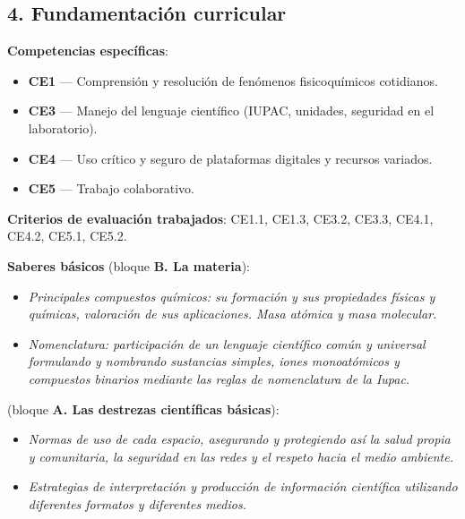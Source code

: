 \documentclass[11pt,a4paper]{article}
\begin{document}
\subsection*{4. Fundamentación curricular}
\textbf{Competencias específicas}:
\begin{itemize}
    \item \textbf{CE1} --- Comprensión y resolución de fenómenos fisicoquímicos cotidianos.
    \item \textbf{CE3} --- Manejo del lenguaje científico (IUPAC, unidades, seguridad en el laboratorio).
    \item \textbf{CE4} --- Uso crítico y seguro de plataformas digitales y recursos variados.
    \item \textbf{CE5} --- Trabajo colaborativo.
\end{itemize}

\textbf{Criterios de evaluación trabajados}: CE1.1, CE1.3, CE3.2, CE3.3, CE4.1, CE4.2, CE5.1, CE5.2.

\textbf{Saberes básicos} (bloque \textbf{B. La materia}):
\begin{itemize}
    \item \textit{Principales compuestos químicos: su formación y sus propiedades físicas y químicas, valoración de sus aplicaciones. Masa atómica y masa molecular.}
    \item \textit{Nomenclatura: participación de un lenguaje científico común y universal formulando y nombrando sustancias simples, iones monoatómicos y compuestos binarios mediante las reglas de nomenclatura de la Iupac.}
\end{itemize}
(bloque \textbf{A. Las destrezas científicas básicas}):
\begin{itemize}
    \item \textit{Normas de uso de cada espacio, asegurando y protegiendo así la salud propia y comunitaria, la seguridad en las redes y el respeto hacia el medio ambiente.}
    \item \textit{Estrategias de interpretación y producción de información científica utilizando diferentes formatos y diferentes medios.}
\end{itemize}
\end{document}
